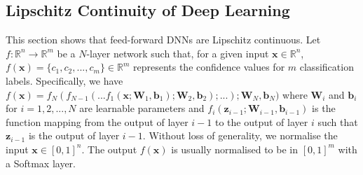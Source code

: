 


\subsection{Lipschitz Continuity of Deep Learning}\label{sec:lipschitz}

This section shows that feed-forward DNNs are Lipschitz continuous.
Let $f: \mathbb{R}^n \rightarrow \mathbb{R}^m$ be a $N$-layer 
network such that, for a given input $\mathbf{x}\in \mathbb{R}^n$, $f(\mathbf{x}) = \{c_1,c_2,...,c_m\}\in \mathbb{R}^m$ represents the confidence values for $m$ classification labels. Specifically, we have 
$f(\mathbf{x}) = f_N(f_{N-1}(...f_1(\mathbf{x};\mathbf{W}_1,\mathbf{b}_1);\mathbf{W}_2,\mathbf{b}_2);...);\mathbf{W}_N,\mathbf{b}_N)
$ where $\mathbf{W}_i$ and $\mathbf{b}_i$ for $i = 1,2,...,N$ are learnable parameters and $f_i(\mathbf{z}_{i-1};\mathbf{W}_{i-1},\mathbf{b}_{i-1})$ is the function mapping from the output of layer $i-1$ to the output of layer $i$ such that $\mathbf{z}_{i-1}$ is the output of layer $i-1$. Without loss of generality, we normalise the input $\mathbf{x}\in [0,1]^n$. The output $f(\mathbf{x})$ is usually normalised to be in $[0,1]^m$ with a Softmax layer. 
	


